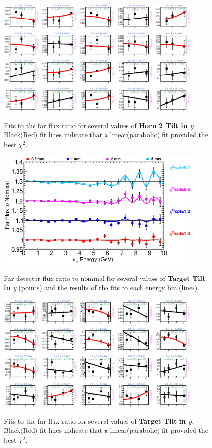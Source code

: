 \begin{figure}[hb]
  \begin{center}
    {\includegraphics[width=4.0in]{figures/Horn2YTilt_far_fits.eps}}
  \end{center}
\caption{ Fits to the far flux ratio for several values of {\bf Horn 2 Tilt in $y$}. Black(Red) fit lines indicate that a linear(parabolic) fit provided the best $\chi^2$. }
\end{figure}

\clearpage

\begin{figure}[ht]
  \begin{center}
    {\includegraphics[width=4.0in]{figures/TargetYTilt_far_summary.eps}}
  \end{center}
\caption{ Far detector flux ratio to nominal for several values of {\bf Target Tilt in $y$} (points) and the results of the fits to each energy bin (lines).}
\end{figure}

\begin{figure}[hb]
  \begin{center}
    {\includegraphics[width=4.0in]{figures/TargetYTilt_far_fits.eps}}
  \end{center}
\caption{ Fits to the far flux ratio for several values of {\bf Target Tilt in $y$}. Black(Red) fit lines indicate that a linear(parabolic) fit provided the best $\chi^2$. }
\end{figure}

